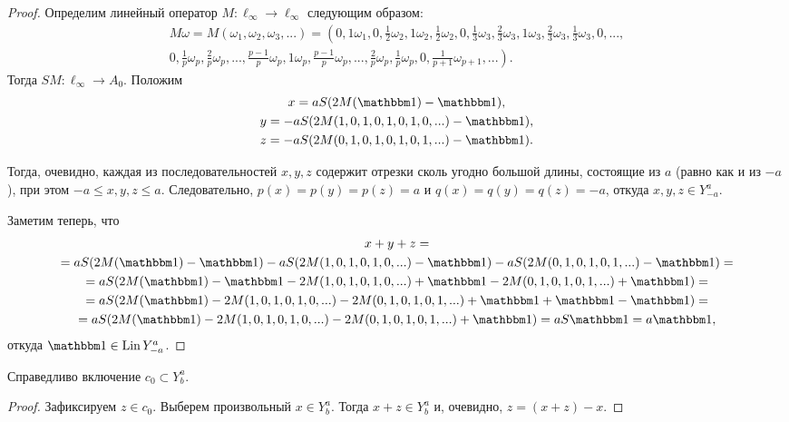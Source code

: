 \begin{proof}
	Определим линейный оператор $M:\ell_\infty \to \ell_\infty$ следующим образом:
	\begin{multline}
		M\omega=
		M(\omega_1,\omega_2,\omega_3,...)=
		\left(
			0, 1\omega_1,
			0, \frac{1}{2}\omega_2, 1\omega_2, \frac{1}{2}\omega_2,
			0, \frac{1}{3}\omega_3, \frac{2}{3}\omega_3, 1\omega_3, \frac{2}{3}\omega_3, \frac{1}{3}\omega_3,
			0, ...,
		\right. \\ \left.
			0, \frac{1}{p}\omega_p, \frac{2}{p}\omega_p, ..., \frac{p-1}{p}\omega_p, 1\omega_p,
				\frac{p-1}{p}\omega_p, ..., \frac{2}{p}\omega_p, \frac{1}{p}\omega_p,
			0, \frac{1}{p+1}\omega_{p+1}, ...
		\right)
		.
	\end{multline}
	Тогда $SM: \ell_\infty \to A_0$.
	Положим
	\begin{gather}
		x=aS(2M(\one)-\one),
		\\
		y=-aS(2M(1,0,1,0,1,0,1,0,...)-\one),
		\\
		z=-aS(2M(0,1,0,1,0,1,0,1,...)-\one).
	\end{gather}

	Тогда, очевидно, каждая из последовательностей $x,y,z$ содержит отрезки сколь угодно большой длины,
	состоящие из $a$ (равно как и из $-a$), при этом $-a \leq x,y,z \leq a$.
	Следовательно, $p(x)=p(y)=p(z) = a$ и $q(x)=q(y)=q(z) = -a$,
	откуда $x,y,z \in Y^a_{-a}$.

	Заметим теперь, что
	\begin{multline}
		x + y + z
		=
		\\=
		aS(2M(\one)-\one) - aS(2M(1,0,1,0,1,0,...)-\one) - aS(2M(0,1,0,1,0,1,...)-\one)
		=
		\\=
		aS(2M(\one)-\one  -    2M(1,0,1,0,1,0,...)+\one  -    2M(0,1,0,1,0,1,...)+\one)
		=
		\\=
		aS(2M(\one) - 2M(1,0,1,0,1,0,...) - 2M(0,1,0,1,0,1,...)+\one+\one-\one)
		=
		\\=
		aS(2M(\one) - 2M(1,0,1,0,1,0,...) - 2M(0,1,0,1,0,1,...)+\one)
		=
		aS\one
		=
		a\one
		,
	\end{multline}
	откуда $\one \in \operatorname{Lin} Y^a_{-a}$.
\end{proof}


\begin{lemma}
	\label{lem:c_0_Lin_alpha_0}
	Справедливо включение $c_0 \subset Y^a_b$.
\end{lemma}

\begin{proof}
	Зафиксируем $z\in c_0$.
	Выберем произвольный $x \in Y^a_b$.
	Тогда $x+z\in Y^a_b$ и, очевидно, $z=(x+z)-x$.
\end{proof}

